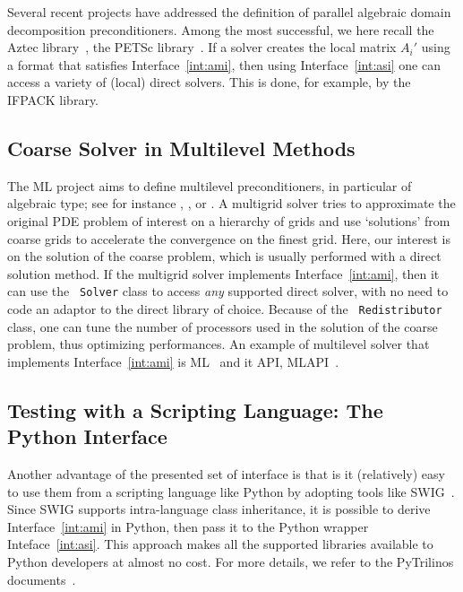 \documentclass[acmtocl]{acmtrans2m}
\begin{document}
\smallskip

Several recent projects have addressed the definition of parallel algebraic
domain decomposition preconditioners. Among the most successful, we here
recall the Aztec library~\cite{Aztec}, the PETSc library~\cite{petsc-guide}.
If a solver creates the local matrix $A_i'$ using a format that satisfies
Interface~\ref{int:ami}, then using Interface~\ref{int:asi} one can access a
variety of (local) direct solvers. This is done, for example, by the IFPACK library.

\subsection{Coarse Solver in Multilevel Methods}
\label{sec:ml}

The ML project aims to define multilevel preconditioners, in particular of
algebraic type; see for instance \cite{brandt.classic}, \cite{hack.book}, or
\cite{hack2.book}.
A multigrid solver tries to approximate
the original PDE problem of interest on a hierarchy of grids and use
`solutions' from coarse grids to accelerate the convergence
on the finest grid.  
Here, our interest is on the solution of the coarse
problem, which is usually performed with a direct solution method. If the
multigrid solver implements Interface~\ref{int:ami}, then it can use the {\tt
Solver} class to access {\sl any} supported direct solver, with no need to
code an adaptor to the direct library of choice. Because of the {\tt
Redistributor} class, one can tune the number of processors used in the
solution of the coarse problem, thus optimizing performances. An example of
multilevel solver that implements Interface~\ref{int:ami} is
ML~\cite{ml-guide} and it API, MLAPI~\cite{sala05object}.

\subsection{Testing with a Scripting Language: The Python Interface}
\label{sec:pytrilinos}

Another advantage of the presented set of interface is that is it (relatively)
  easy to use them from a scripting language like Python by adopting tools
  like SWIG~\cite{swig}. Since SWIG supports intra-language class inheritance,
  it is possible to derive Interface~\ref{int:ami} in Python, then pass it
  to the Python wrapper Inteface~\ref{int:asi}. This approach makes all the
  supported libraries available to Python developers at almost no cost. For
  more details, we refer to the PyTrilinos
  documents~\cite{sala05pytrilinos,pytrilinos-la-guide}. 
  
\end{document}
